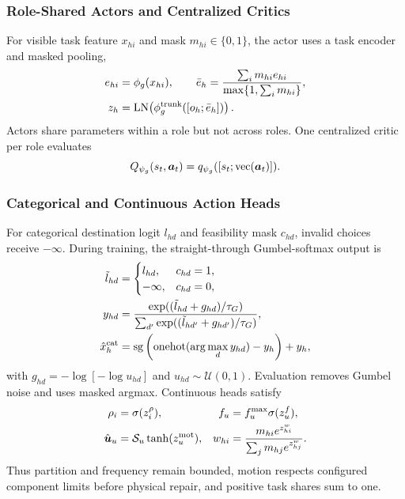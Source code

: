 \subsubsection{Role-Shared Actors and Centralized Critics}
For visible task feature $x_{hi}$ and mask $m_{hi}\in\{0,1\}$, the actor uses
a task encoder and masked pooling,
\begin{align}
e_{hi}&=\phi_g(x_{hi}),\qquad
\bar e_h=\frac{\sum_i m_{hi}e_{hi}}
{\max\{1,\sum_i m_{hi}\}},\nonumber\\
z_h&=\operatorname{LN}\!\left(
\phi_g^{\rm trunk}([o_h;\bar e_h])\right).
\label{eq:actor_encoder}
\end{align}
Actors share parameters within a role but not across roles. One centralized
critic per role evaluates
\begin{equation}
Q_{\psi_g}(s_t,\boldsymbol{a}_t)=q_{\psi_g}([s_t;\operatorname{vec}(\boldsymbol{a}_t)]).
\label{eq:centralized_critic}
\end{equation}

\subsubsection{Categorical and Continuous Action Heads}
For categorical destination logit $l_{hd}$ and feasibility mask $c_{hd}$,
invalid choices receive $-\infty$. During training, the straight-through
Gumbel-softmax output is
\begin{align}
\tilde l_{hd}&=\begin{cases}l_{hd},&c_{hd}=1,\\-\infty,&c_{hd}=0,\end{cases}
\nonumber\\
y_{hd}&=\frac{\exp((\tilde l_{hd}+g_{hd})/\tau_G)}
{\sum_{d'}\exp((\tilde l_{hd'}+g_{hd'})/\tau_G)},\nonumber\\
\hat x_h^{\rm cat}&=\operatorname{sg}
\left(\operatorname{onehot}(\arg\max_d y_{hd})-y_h\right)+y_h,
\label{eq:gumbel_action}
\end{align}
with $g_{hd}=-\log[-\log u_{hd}]$ and $u_{hd}\sim\mathcal U(0,1)$. Evaluation
removes Gumbel noise and uses masked argmax. Continuous heads satisfy
\begin{align}
\rho_i&=\sigma(z_i^\rho),
&f_u&=f_u^{\max}\sigma(z_u^f),\nonumber\\
\hat{\boldsymbol{u}}_u&=\mathcal S_u\tanh(z_u^{\rm mot}),
&w_{hi}&=\frac{m_{hi}e^{z_{hi}^w}}{\sum_jm_{hj}e^{z_{hj}^w}}.
\label{eq:continuous_heads}
\end{align}
Thus partition and frequency remain bounded, motion respects configured
component limits before physical repair, and positive task shares sum to one.

